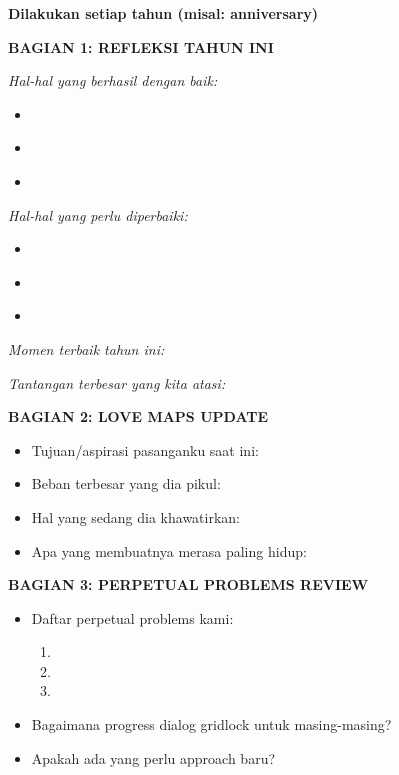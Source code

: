 \begin{praktikbox}
\textbf{Dilakukan setiap tahun (misal: anniversary)}

\vspace{0.3cm}
\textbf{BAGIAN 1: REFLEKSI TAHUN INI}

\textit{Hal-hal yang berhasil dengan baik:}
\begin{itemize}[itemsep=0.1cm]
    \item[$\square$] \\
    \item[$\square$] \\
    \item[$\square$] \\
\end{itemize}

\textit{Hal-hal yang perlu diperbaiki:}
\begin{itemize}[itemsep=0.1cm]
    \item[$\square$] \\
    \item[$\square$] \\
    \item[$\square$] \\
\end{itemize}

\textit{Momen terbaik tahun ini:} \hrulefill

\textit{Tantangan terbesar yang kita atasi:} \hrulefill

\textbf{BAGIAN 2: LOVE MAPS UPDATE}
\begin{itemize}[itemsep=0.1cm]
    \item[$\square$] Tujuan/aspirasi pasanganku saat ini:
    \item[$\square$] Beban terbesar yang dia pikul:
    \item[$\square$] Hal yang sedang dia khawatirkan:
    \item[$\square$] Apa yang membuatnya merasa paling hidup:
\end{itemize}

\textbf{BAGIAN 3: PERPETUAL PROBLEMS REVIEW}
\begin{itemize}[itemsep=0.1cm]
    \item[$\square$] Daftar perpetual problems kami:
    \begin{enumerate}
        \item 
        \item 
        \item 
    \end{enumerate}
    \item[$\square$] Bagaimana progress dialog gridlock untuk masing-masing?
    \item[$\square$] Apakah ada yang perlu approach baru?
\end{itemize}


\end{praktikbox}
